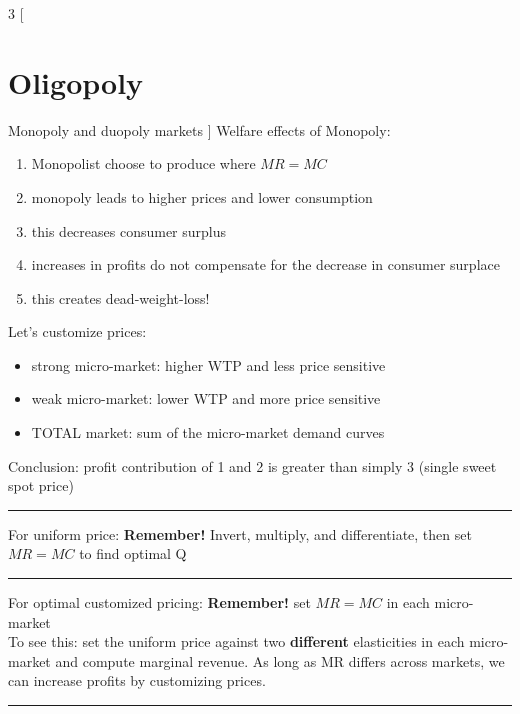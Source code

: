 \documentclass[8pt]{report}
\begin{document}
\begin{multicols}{3}
[
\section{Oligopoly}
Monopoly and duopoly markets
]
Welfare effects of Monopoly:
\begin{enumerate}
\item Monopolist choose to produce where $MR=MC$
\item monopoly leads to higher prices and lower consumption
\item this decreases consumer surplus
\item increases in profits do not compensate for the decrease in consumer surplace
\item this creates dead-weight-loss!
\end{enumerate}

Let's customize prices:
\begin{itemize}
\item strong micro-market: higher WTP and less price sensitive
\item weak micro-market: lower WTP and more price sensitive
\item TOTAL market: sum of the micro-market demand curves 
\end{itemize}
Conclusion: profit contribution of 1 and 2 is greater than simply 3 (single sweet spot price) \\
\hrule

For uniform price:
\textbf{Remember!} Invert, multiply, and differentiate, then set $MR=MC$ to find optimal Q \\

\hrule 

For optimal customized pricing: \textbf{Remember!} set $MR=MC$ in each micro-market \\

To see this: set the uniform price against two \textbf{different} elasticities in each micro-market and compute marginal revenue. As long as MR differs across markets, we can increase profits by customizing prices. 
\hrule 


\end{multicols}
\end{document}
